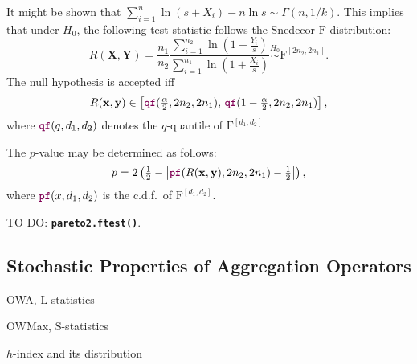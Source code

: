 \documentclass[11pt]{article}\usepackage{graphicx, color}
\newcommand{\hlfunctioncall}[1]{\textcolor[rgb]{0.501960784313725,0,0.329411764705882}{\textbf{#1}}}%
\newcommand{\Rfunc}[1]{\texttt{\hlfunctioncall{#1}}}
\newcommand{\vect}[1]{{\mathbf{#1}}}
\theoremstyle{remark}
\theoremstyle{definition}
\begin{document}
It might be shown that  $\sum_{i=1}^n \ln(s+X_i)-n\ln s\sim\Gamma(n,1/k)$.
This implies that under $H_0$, the following test statistic
follows the Snedecor $\mathrm{F}$ distribution:
\begin{equation}
R(\vect{X},\vect{Y})=\dfrac{n_1}{n_2}
   \dfrac{\sum_{i=1}^{n_2} \ln\left(1+\frac{Y_i}{s}\right)}
         {\sum_{i=1}^{n_1} \ln\left(1+\frac{X_i}{s}\right)}
\stackrel{H_0}{\sim}\mathrm{F}^{[2n_2,2n_1]}.
\end{equation}
The null hypothesis is accepted iff
\[
R(\vect{x},\vect{y})\in\left[\text{\Rfunc{qf}}(\tfrac{\alpha}{2},2n_2,2n_1),\,
\text{\Rfunc{qf}}(1-\tfrac{\alpha}{2},2n_2,2n_1)\right],
\]
where $\text{\Rfunc{qf}}(q,d_1,d_2)$ denotes the $q$-quantile
of $\mathrm{F}^{[d_1,d_2]}$

The $p$-value may be determined as follows:
\begin{equation}
p=2\left(\tfrac{1}{2}-\left|\text{\Rfunc{pf}}(R(\vect{x},\vect{y}), 2n_2, 2n_1)-\tfrac{1}{2}\right|\right),
\end{equation}
where $\text{\Rfunc{pf}}(x,d_1,d_2)$ 
is the c.d.f.~of $\mathrm{F}^{[d_1,d_2]}$.

\medskip
TO DO: \Rfunc{pareto2.\allowbreak ftest()}.




\subsection{Stochastic Properties of Aggregation Operators}

OWA, L-statistics

OWMax, S-statistics

$h$-index and its distribution
\end{document}
